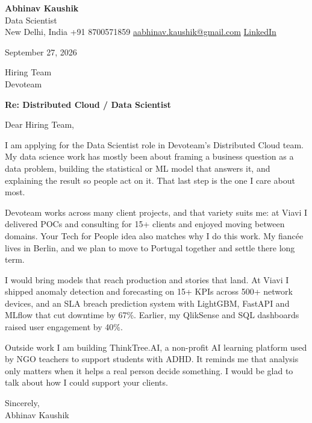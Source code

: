 \documentclass[11pt,a4paper]{article}
\begin{document}
{\Large\bfseries Abhinav Kaushik}\\
Data Scientist\\
New Delhi, India \textbar{} +91 8700571859 \textbar{} \href{mailto:aabhinav.kaushik@gmail.com}{aabhinav.kaushik@gmail.com} \textbar{} \href{https://www.linkedin.com/in/abhinav-kaushik10/}{LinkedIn}  

September 27, 2026

Hiring Team\\
Devoteam

\textbf{Re: Distributed Cloud / Data Scientist}

Dear Hiring Team,

I am applying for the Data Scientist role in Devoteam's Distributed Cloud team. My data science work has mostly been about framing a business question as a data problem, building the statistical or ML model that answers it, and explaining the result so people act on it. That last step is the one I care about most.

Devoteam works across many client projects, and that variety suits me: at Viavi I delivered POCs and consulting for 15+ clients and enjoyed moving between domains. Your Tech for People idea also matches why I do this work. My fiancée lives in Berlin, and we plan to move to Portugal together and settle there long term.

I would bring models that reach production and stories that land. At Viavi I shipped anomaly detection and forecasting on 15+ KPIs across 500+ network devices, and an SLA breach prediction system with LightGBM, FastAPI and MLflow that cut downtime by 67\%. Earlier, my QlikSense and SQL dashboards raised user engagement by 40\%.

Outside work I am building ThinkTree.AI, a non-profit AI learning platform used by NGO teachers to support students with ADHD. It reminds me that analysis only matters when it helps a real person decide something. I would be glad to talk about how I could support your clients.

Sincerely,\\[4pt]
Abhinav Kaushik
\end{document}
